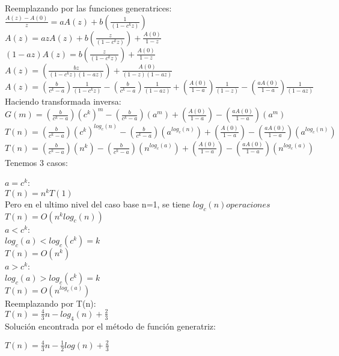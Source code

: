 \documentclass{article}
\begin{document}
\begin{enumerate}[label=\textbf{\alph*.}]
  Reemplazando por las funciones generatrices:\\
  $\frac{A(z) - A(0)}{z} = aA(z) + b(\frac{1}{(1-c^k z)})$\\
  $A(z) = azA(z) + b(\frac{z}{(1-c^k z)}) + \frac{A(0)}{1-z}$\\
  $(1-az)A(z) = b(\frac{z}{(1-c^k z)}) + \frac{A(0)}{1-z}$\\
  $A(z) = (\frac{bz}{(1-c^k z)(1-az)}) + \frac{A(0)}{(1-z)(1-az)}$\\
  $A(z) = (\frac{b}{c^k - a})\frac{1}{(1-c^k z)} - (\frac{b}{c^k - a})\frac{1}{(1-az)} + (\frac{A(0)}{1-a})\frac{1}{(1-z)} - (\frac{aA(0)}{1-a})\frac{1}{(1-az)}$\\
  Haciendo transformada inversa:\\
  $G(m) = (\frac{b}{c^k - a})(c^k)^m - (\frac{b}{c^k - a})(a^m) + (\frac{A(0)}{1-a}) - (\frac{aA(0)}{1-a})(a^m)$\\
  $T(n) = (\frac{b}{c^k - a})(c^k)^{log_c(n)} - (\frac{b}{c^k - a})(a^{log_c(n)}) + (\frac{A(0)}{1-a}) - (\frac{aA(0)}{1-a})(a^{log_c(n)})$\\
  $T(n) = (\frac{b}{c^k - a})(n^k) - (\frac{b}{c^k - a})(n^{log_c(a)}) + (\frac{A(0)}{1-a}) - (\frac{aA(0)}{1-a})(n^{log_c(a)})$\\
  
  Tenemos 3 casos:
    
    $a=c^k$:\\
    $T(n)=n^{k}T(1)$\\
    Pero en el ultimo nivel del caso base n=1, se tiene $log_c(n) operaciones$\\
    $T(n)=O(n^{k}log_c(n))$\\
    
    $a<c^k$:\\
    $log_c(a) < log_c(c^k)=k$\\
    $T(n)=O(n^k)$\\
    
    $a>c^k$:\\
    $log_c(a) > log_c(c^k)=k$\\
    $T(n)=O(n^{log_c(a)})$\\
  
  
  Reemplazando por T(n):\\
  $T(n) = \frac{4}{3}n - log_4(n) + \frac{2}{3}$\\
  
  Soluci\'on encontrada por el m\'etodo de función generatriz:
  \begin{center}
  	$T(n) = \frac{4}{3}n - \frac{1}{2}log(n) + \frac{2}{3}$\\
  \end{center}


\end{enumerate}
\end{document}
